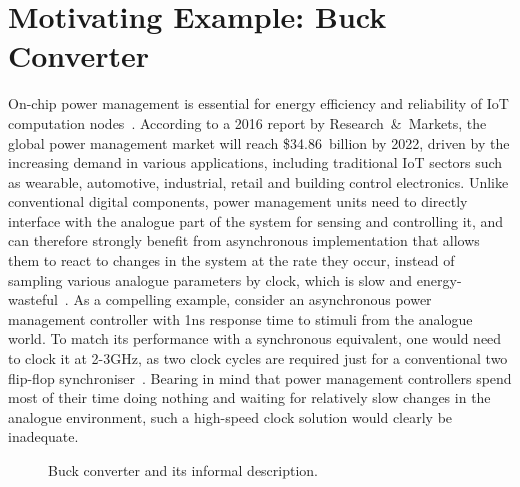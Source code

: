 \documentclass[british, journal]{IEEEtran}
\begin{document}
\section{Motivating Example: Buck Converter\label{sec:Motivating Example}}

On-chip power management is essential for energy efficiency and reliability of
IoT computation nodes~\cite{7287733}. According to a 2016 report by
Research~\&~Markets, the global power management market will reach \$34.86~billion
by 2022, driven by the increasing demand in various applications, including
traditional IoT sectors such as wearable, automotive, industrial, retail and
building control electronics. Unlike conventional digital components, power
management units need to directly interface with the analogue part of the system
for sensing and controlling it, and can therefore strongly benefit from asynchronous
implementation that allows them to react to changes in the system at the rate
they occur, instead of sampling various analogue parameters by clock, which is
slow and energy-wasteful~\cite{2014_sokolov_ftfc}\cite{sokolov2015design}.
As a compelling example, consider an asynchronous power management controller with
1ns response time to stimuli from the analogue world. To match its performance
with a synchronous equivalent, one would need to clock it at 2-3GHz, as two clock
cycles are required just for a conventional two flip-flop
synchroniser~\cite{2008_kinniment_synchronisation}. Bearing in mind that
power management controllers spend most of their time doing nothing and
waiting for relatively slow changes in the analogue environment, such
a high-speed clock solution would clearly be inadequate.

\begin{figure}[t]
\begin{centering}
\par
{}
\par
\end{centering}
\protect\caption{\label{fig:buck}Buck converter and its informal description.}
\vspace{-3mm}
\end{figure}
\end{document}

